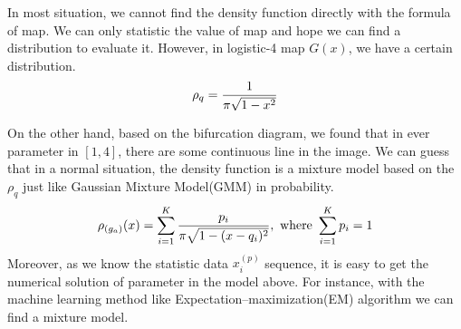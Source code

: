 \documentclass[12pt]{article}
\theoremstyle{plain}
\begin{document}
In most situation, we cannot find the density function directly with the formula of map. We can only statistic the value of map and hope we can find a distribution to evaluate it. However, in logistic-4 map $G(x)$, we have a certain distribution.
$$
\rho_q ={1\over \pi\sqrt{1 - x^2}}
$$



On the other hand, based on the bifurcation diagram, we found that in ever parameter in $[1, 4]$, there are some continuous line in the image. We can guess that in a normal situation, the density function is a mixture model based on the $\rho_q$ just like Gaussian Mixture Model(GMM) in probability.
$$
\rho_{(g_a)}(x) = \sum_{i = 1}^{K} {p_i\over \pi\sqrt{1 - (x - q_i)^2}}, \text{ where } \sum_{i = 1}^{K} p_i = 1
$$
Moreover, as we know the statistic data $x_i^{(p)}$ sequence, it is easy to get the numerical solution of parameter in the model above. For instance, with the machine learning method like Expectation–maximization(EM) algorithm we can find a mixture model.\\[2ex]
\end{document}
